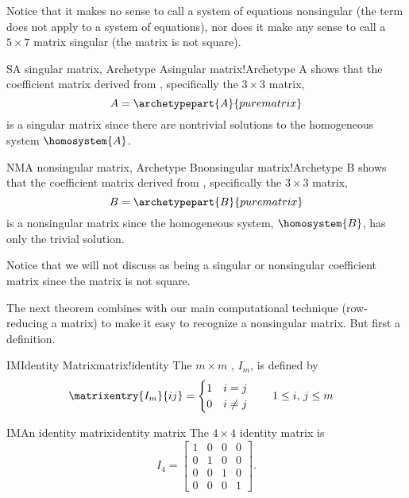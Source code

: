 %
Notice that it makes no sense to call a system of equations nonsingular (the term does not apply to a system of equations), nor does it make any sense to call a $5\times 7$ matrix singular (the matrix is not square).
%
\begin{example}{S}{A singular matrix, Archetype A}{singular matrix!Archetype A}
 shows that the coefficient matrix derived from , specifically the $3\times 3$ matrix,
%
\begin{equation*}
A=\archetypepart{A}{purematrix}
\end{equation*}
%
is a singular matrix since there are nontrivial solutions to the homogeneous system $\homosystem{A}$.
\end{example}
%
\begin{example}{NM}{A nonsingular matrix, Archetype B}{nonsingular matrix!Archetype B}
 shows that the coefficient matrix derived from , specifically the $3\times 3$ matrix,
%
\begin{equation*}
B=\archetypepart{B}{purematrix}
\end{equation*}
%
is a nonsingular matrix since the homogeneous system, $\homosystem{B}$, has only the trivial solution.
\end{example}
%
Notice that we will not discuss  as being a  singular or nonsingular coefficient matrix since the matrix is not square.\par
%
%
The next theorem combines with our main computational technique (row-reducing a matrix) to make it easy to recognize a nonsingular matrix.  But first a definition.
%
\begin{definition}{IM}{Identity Matrix}{matrix!identity}
The $m\times m$ , $I_m$, is defined by
%
\begin{align*}
\matrixentry{I_m}{ij}&=
\begin{cases}
1 & i=j\\
0 & i\neq j
\end{cases}
\quad\quad
1\leq i,\,j\leq m
\end{align*}
%
%
\end{definition}
%
\begin{example}{IM}{An identity matrix}{identity matrix}
The $4\times 4$ identity matrix is
\begin{equation*}
I_4=
\begin{bmatrix}
1&0&0&0\\
0&1&0&0\\
0&0&1&0\\
0&0&0&1
\end{bmatrix}.
\end{equation*}
\end{example}
